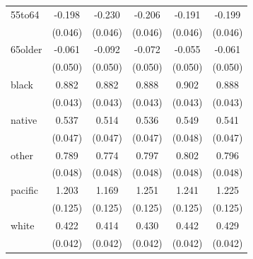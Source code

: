 \documentclass[11pt,a4paper,oldfontcommands]{memoir}
\begin{document}
{\begin{footnotesize}
\begin{tiny}
\begin{longtable}{l*{5}{c}}
55to64              &      -0.198\sym{***}&      -0.230\sym{***}&      -0.206\sym{***}&      -0.191\sym{***}&      -0.199\sym{***}\\
                    &     (0.046)         &     (0.046)         &     (0.046)         &     (0.046)         &     (0.046)         \\
 
65older             &      -0.061         &      -0.092         &      -0.072         &      -0.055         &      -0.061         \\
                    &     (0.050)         &     (0.050)         &     (0.050)         &     (0.050)         &     (0.050)         \\

black               &       0.882\sym{***}&       0.882\sym{***}&       0.888\sym{***}&       0.902\sym{***}&       0.888\sym{***}\\
                    &     (0.043)         &     (0.043)         &     (0.043)         &     (0.043)         &     (0.043)         \\
 
native              &       0.537\sym{***}&       0.514\sym{***}&       0.536\sym{***}&       0.549\sym{***}&       0.541\sym{***}\\
                    &     (0.047)         &     (0.047)         &     (0.047)         &     (0.048)         &     (0.047)         \\
 
other               &       0.789\sym{***}&       0.774\sym{***}&       0.797\sym{***}&       0.802\sym{***}&       0.796\sym{***}\\
                    &     (0.048)         &     (0.048)         &     (0.048)         &     (0.048)         &     (0.048)         \\
 
pacific             &       1.203\sym{***}&       1.169\sym{***}&       1.251\sym{***}&       1.241\sym{***}&       1.225\sym{***}\\
                    &     (0.125)         &     (0.125)         &     (0.125)         &     (0.125)         &     (0.125)         \\
 
white               &       0.422\sym{***}&       0.414\sym{***}&       0.430\sym{***}&       0.442\sym{***}&       0.429\sym{***}\\
                    &     (0.042)         &     (0.042)         &     (0.042)         &     (0.042)         &     (0.042)         \\
 

\end{longtable}
\end{tiny}
\end{footnotesize}}
\end{document}
